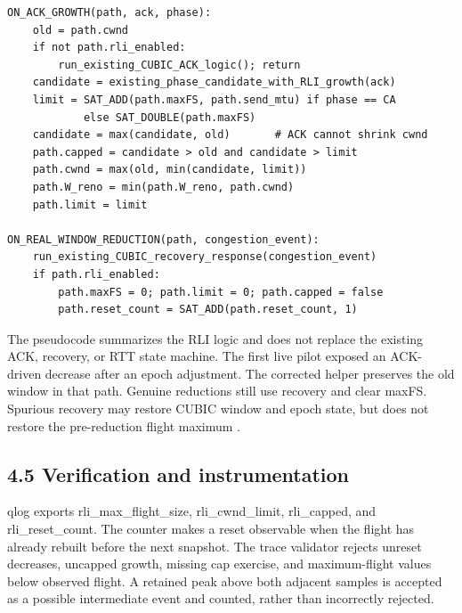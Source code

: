 \begingroup\footnotesize
\begin{verbatim}
ON_ACK_GROWTH(path, ack, phase):
    old = path.cwnd
    if not path.rli_enabled:
        run_existing_CUBIC_ACK_logic(); return
    candidate = existing_phase_candidate_with_RLI_growth(ack)
    limit = SAT_ADD(path.maxFS, path.send_mtu) if phase == CA
            else SAT_DOUBLE(path.maxFS)
    candidate = max(candidate, old)       # ACK cannot shrink cwnd
    path.capped = candidate > old and candidate > limit
    path.cwnd = max(old, min(candidate, limit))
    path.W_reno = min(path.W_reno, path.cwnd)
    path.limit = limit

ON_REAL_WINDOW_REDUCTION(path, congestion_event):
    run_existing_CUBIC_recovery_response(congestion_event)
    if path.rli_enabled:
        path.maxFS = 0; path.limit = 0; path.capped = false
        path.reset_count = SAT_ADD(path.reset_count, 1)
\end{verbatim}
\endgroup

The pseudocode summarizes the RLI logic and does not replace the existing ACK, recovery, or RTT state machine. The first live pilot exposed an ACK-driven decrease after an epoch adjustment. The corrected helper preserves the old window in that path. Genuine reductions still use recovery and clear maxFS. Spurious recovery may restore CUBIC window and epoch state, but does not restore the pre-reduction flight maximum \cite{ref12}.


\subsection*{4.5 Verification and instrumentation}

qlog exports rli\_max\_flight\_size, rli\_cwnd\_limit, rli\_capped, and rli\_reset\_count. The counter makes a reset observable when the flight has already rebuilt before the next snapshot. The trace validator rejects unreset decreases, uncapped growth, missing cap exercise, and maximum-flight values below observed flight. A retained peak above both adjacent samples is accepted as a possible intermediate event and counted, rather than incorrectly rejected.


